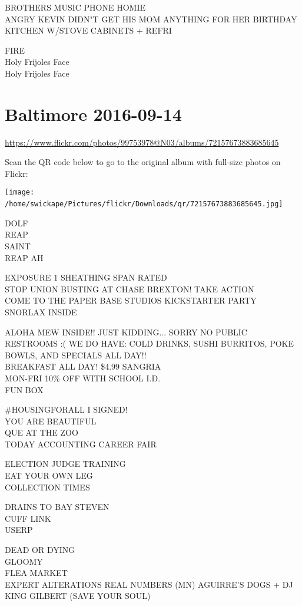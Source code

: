 \documentclass[10pt,letterpaper]{article}
\begin{document}
BROTHERS MUSIC PHONE HOMIE\\
ANGRY KEVIN DIDN"T GET HIS MOM ANYTHING FOR HER BIRTHDAY\\
KITCHEN W/STOVE CABINETS + REFRI

FIRE\\
Holy Frijoles Face\\
Holy Frijoles Face
\

\section*{Baltimore 2016-09-14}

\url{https://www.flickr.com/photos/99753978@N03/albums/72157673883685645}

Scan the QR code below to go to the original album with full-size photos on Flickr:

\texttt{[image: /home/swickape/Pictures/flickr/Downloads/qr/72157673883685645.jpg]}
\

DOLF\\
REAP\\
SAINT\\
REAP AH

EXPOSURE 1 SHEATHING SPAN RATED\\
STOP UNION BUSTING AT CHASE BREXTON!   TAKE ACTION\\
COME TO THE PAPER BASE STUDIOS KICKSTARTER PARTY\\
SNORLAX INSIDE

ALOHA MEW INSIDE!! JUST KIDDING...  SORRY NO PUBLIC RESTROOMS :( WE DO HAVE: COLD DRINKS, SUSHI BURRITOS, POKE BOWLS, AND SPECIALS ALL DAY!!\\
BREAKFAST ALL DAY!  \$4.99 SANGRIA\\
MON{-}FRI 10\% OFF WITH SCHOOL I.D.\\
FUN BOX

\#HOUSINGFORALL I SIGNED!\\
YOU ARE BEAUTIFUL\\
QUE AT THE ZOO\\
TODAY ACCOUNTING CAREER FAIR

ELECTION JUDGE TRAINING\\
EAT YOUR OWN LEG\\
COLLECTION TIMES

DRAINS TO BAY STEVEN\\
CUFF LINK\\
USERP

DEAD OR DYING\\
GLOOMY\\
FLEA MARKET\\
EXPERT ALTERATIONS REAL NUMBERS (MN) AGUIRRE'S DOGS + DJ KING GILBERT (SAVE YOUR SOUL)
\end{document}
